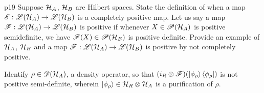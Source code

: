 \documentclass[a4paper, 11pt]{article}
\begin{document}
\begin{problem}{%
	}{p19%
	}
	Suppose $\mathcal{H}_A$, $\mathcal{H}_B$ are Hilbert spaces. State the definition of when a map ${\mathscr{E}}:{\mathscr{L}}(\mathcal{H}_A)\to {\mathscr{L}}(\mathcal{H}_B)$ is a completely positive map. Let us say a map ${\mathscr{F}}:{\mathscr{L}}(\mathcal{H}_A)\to {\mathscr{L}}(\mathcal{H}_B)$ is positive if whenever $X\in {\mathscr{P}}(\mathcal{H}_A)$ is positive semidefinite, we have ${\mathscr{F}}(X)\in {\mathscr{P}}(\mathcal{H}_B)$ is positive definite. Provide an example of $\mathcal{H}_A$, $\mathcal{H}_B$ and a map ${\mathscr{F}}:{\mathscr{L}}(\mathcal{H}_A)\to {\mathscr{L}}(\mathcal{H}_B)$ is positive by not completely positive.\parinn
	
	Identify $\rho\in {\mathscr{D}}(\mathcal{H}_A)$, a density operator, so that $(i_R\otimes {\mathscr{F}})(\ket{\phi_{\rho}}\bra{\phi_{\rho}})$ is not positive semi-definite, wherein $\ket{\phi_{\rho}}\in \mathcal{H}_R\otimes \mathcal{H}_A$ is a purification of $\rho$.
\end{problem}
\end{document}
